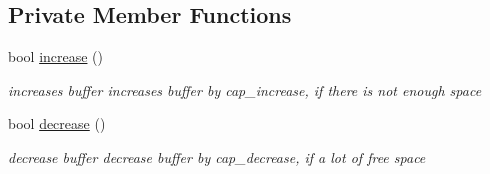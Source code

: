 \subsection*{Private Member Functions}
\begin{DoxyCompactItemize}
\item 
bool \hyperlink{classVector_afa2a3c5660a7a34794975a6bb80d175f}{increase} ()
\begin{DoxyCompactList}\small\item\em increases buffer  increases buffer by cap\+\_\+increase, if there is not enough space \end{DoxyCompactList}\item 
bool \hyperlink{classVector_a770a5b403dcb82ea6954cda918d278d6}{decrease} ()
\begin{DoxyCompactList}\small\item\em decrease buffer  decrease buffer by cap\+\_\+decrease, if a lot of free space \end{DoxyCompactList}\end{DoxyCompactItemize}
